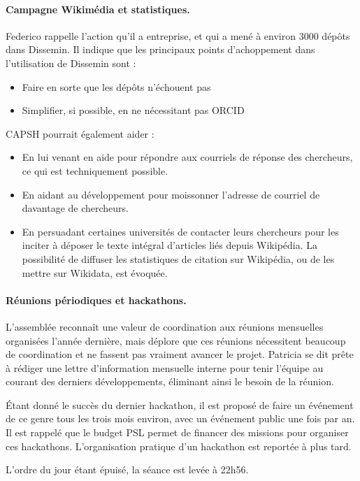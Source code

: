 \documentclass{scrartcl}
\begin{document}
\paragraph{Campagne Wikimédia et statistiques.}
Federico rappelle l'action qu'il a entreprise, et qui a mené à environ 3000 dépôts dans Dissemin. Il indique que les principaux points d'achoppement dans l'utilisation de Dissemin sont :
    \begin{itemize}
    \item Faire en sorte que les dépôts n'échouent pas
    \item Simplifier, si possible, en ne nécessitant pas ORCID
\end{itemize}

CAPSH pourrait également aider :
    \begin{itemize}
    \item En lui venant en aide pour répondre aux courriels de réponse des chercheurs, ce qui est techniquement possible.
    \item En aidant au développement pour moissonner l'adresse de courriel de davantage de chercheurs.
    \item En persuadant certaines universités de contacter leurs chercheurs pour les inciter à déposer le texte intégral d'articles liés depuis Wikipédia. La possibilité de diffuser les statistiques de citation sur Wikipédia, ou de les mettre sur Wikidata, est évoquée.
    \end{itemize} 

\paragraph{Réunions périodiques et hackathons.}
L'assemblée reconnaît une valeur de coordination aux réunions mensuelles organisées l'année dernière, mais déplore que ces réunions nécessitent beaucoup de coordination et ne fassent pas vraiment avancer le projet. Patricia se dit prête à rédiger une lettre d'information mensuelle interne pour tenir l'équipe au courant des derniers développements, éliminant ainsi le besoin de la réunion.

Étant donné le succès du dernier hackathon, il est proposé de faire un événement de ce genre tous les trois mois environ, avec un événement public une fois par an. Il est rappelé que le budget PSL permet de financer des missions pour organiser ces hackathons. L'organisation pratique d'un hackathon est reportée à plus tard.

\bigskip

L'ordre du jour étant épuisé, la séance est levée à 22h56.
\end{document}
